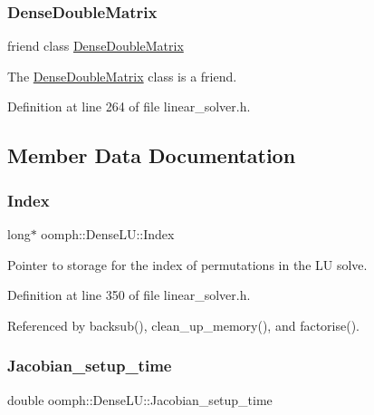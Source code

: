\subsubsection{\texorpdfstring{Dense\+Double\+Matrix}{DenseDoubleMatrix}}
{\footnotesize\ttfamily friend class \hyperlink{classoomph_1_1DenseDoubleMatrix}{Dense\+Double\+Matrix}\hspace{0.3cm}{\ttfamily [friend]}}



The \hyperlink{classoomph_1_1DenseDoubleMatrix}{Dense\+Double\+Matrix} class is a friend. 



Definition at line 264 of file linear\+\_\+solver.\+h.



\subsection{Member Data Documentation}
\mbox{\label{classoomph_1_1DenseLU_a66730f6a64112fe29601fefb08f4dc4f}} 
\subsubsection{\texorpdfstring{Index}{Index}}
{\footnotesize\ttfamily long$\ast$ oomph\+::\+Dense\+L\+U\+::\+Index\hspace{0.3cm}{\ttfamily [private]}}



Pointer to storage for the index of permutations in the LU solve. 



Definition at line 350 of file linear\+\_\+solver.\+h.



Referenced by backsub(), clean\+\_\+up\+\_\+memory(), and factorise().

\mbox{\label{classoomph_1_1DenseLU_a3618b27ae286e468251f52091ddf1e70}} 
\subsubsection{\texorpdfstring{Jacobian\+\_\+setup\+\_\+time}{Jacobian\_setup\_time}}
{\footnotesize\ttfamily double oomph\+::\+Dense\+L\+U\+::\+Jacobian\+\_\+setup\+\_\+time\hspace{0.3cm}{\ttfamily [protected]}}



